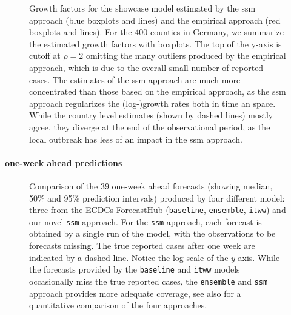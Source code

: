 \begin{figure}
    \resizebox{\textwidth}{!}{%
    }
    \caption{Growth factors for the showcase model estimated by the \acrshort{ssm} approach (blue boxplots and lines) and the empirical approach (red boxplots and lines). For the $400$ counties in Germany, we summarize the estimated growth factors with boxplots. The top of the y-axis is cutoff at $\rho = 2$ omitting the many outliers produced by the empirical approach, which is due to the overall small number of reported cases. The estimates of the \acrshort{ssm} approach are much more concentrated than those based on the empirical approach, as the \acrshort{ssm} approach regularizes the (log-)growth rates both in time an space. While the country level estimates (shown by dashed lines) mostly agree, they diverge at the end of the observational period, as the local outbreak \citep{Gunther2020SARSCoV2} has less of an impact in the \acrshort{ssm} approach.}
    \label{fig:regional_showcase_rho.tex}
\end{figure}




\paragraph{one-week ahead predictions}

\begin{figure}
    \resizebox{\textwidth}{!}{%
    }
    \caption{Comparison of the $39$ one-week ahead forecasts (showing median, 50\% and 95\% prediction intervals) produced by four different model: three from the ECDCs ForecastHub (\texttt{baseline}, \texttt{ensemble}, \texttt{itww}) and our novel \texttt{ssm} approach. For the \texttt{ssm} approach, each forecast is obtained by a single run of the model, with the observations to be forecasts missing. The true reported cases after one week are indicated by a dashed line. Notice the log-scale of the $y$-axis. While the forecasts provided by the \texttt{baseline} and \texttt{itww} models occasionally miss the true reported cases, the \texttt{ensemble} and \texttt{ssm} approach provides more adequate coverage, see also  for a quantitative comparison of the four approaches.}

    \label{fig:regional_forecasts_comparison.tex}
\end{figure}


